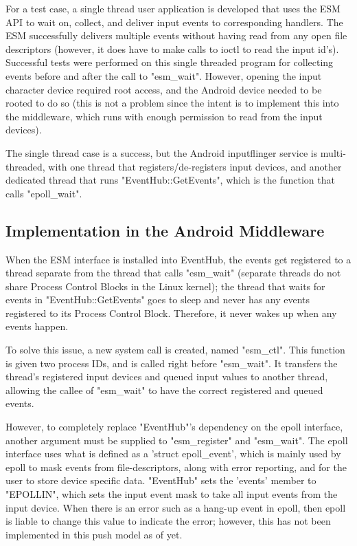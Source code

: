 \documentclass[10pt,journal,compsoc]{IEEEtran}
\begin{document}
For a test case, a single thread user application is developed that uses the ESM API to wait on, collect, and deliver input events to corresponding handlers. The ESM successfully delivers multiple events without having read from any open file descriptors (however, it does have to make calls to ioctl to read the input id's). Successful tests were performed on this single threaded program for collecting events before and after the call to "esm\_wait". However, opening the input character device required root access, and the Android device needed to be rooted to do so (this is not a problem since the intent is to implement this into the middleware, which runs with enough permission to read from the input devices).

The single thread case is a success, but the Android inputflinger service is multi-threaded, with one thread that registers/de-registers input devices, and another dedicated thread that runs "EventHub::GetEvents", which is the function that calls "epoll\_wait".

\subsection{Implementation in the Android Middleware}
\label{sec:middleware}
When the ESM interface is installed into EventHub, the events get registered to a thread separate from the thread that calls "esm\_wait" (separate threads do not share Process Control Blocks in the Linux kernel); the thread that waits for events in "EventHub::GetEvents" goes to sleep and never has any events registered to its Process Control Block. Therefore, it never wakes up when any events happen.

To solve this issue, a new system call is created, named "esm\_ctl". This function is given two process IDs, and is called right before "esm\_wait". It transfers the thread's registered input devices and queued input values to another thread, allowing the callee of "esm\_wait" to have the correct registered and queued events.

However, to completely replace "EventHub"'s dependency on the epoll interface, another argument must be supplied to "esm\_register" and "esm\_wait". The epoll interface uses what is defined as a 'struct epoll\_event', which is mainly used by epoll to mask events from file-descriptors, along with error reporting, and for the user to store device specific data. "EventHub" sets the 'events' member to "EPOLLIN", which sets the input event mask to take all input events from the input device. When there is an error such as a hang-up event in epoll, then epoll is liable to change this value to indicate the error; however, this has not been implemented in this push model as of yet.
\end{document}
